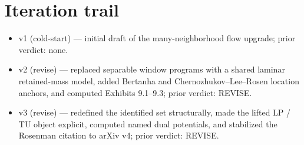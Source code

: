 \documentclass[11pt]{article}
\theoremstyle{definition}
\theoremstyle{plain}
\theoremstyle{remark}
\begin{document}
\section{Iteration trail}
\begin{itemize}[leftmargin=*]
\item v1 (cold-start) --- initial draft of the many-neighborhood flow upgrade; prior verdict: none.
\item v2 (revise) --- replaced separable window programs with a shared laminar retained-mass model, added Bertanha and Chernozhukov--Lee--Rosen location anchors, and computed Exhibits 9.1--9.3; prior verdict: REVISE.
\item v3 (revise) --- redefined the identified set structurally, made the lifted LP / TU object explicit, computed named dual potentials, and stabilized the Rosenman citation to arXiv v4; prior verdict: REVISE.
\end{itemize}
\end{document}
